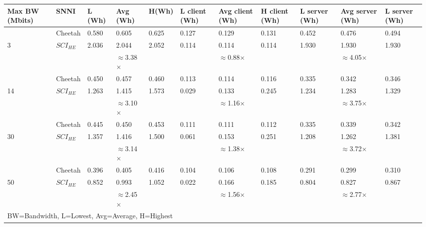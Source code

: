 \begin{tabular}{lllllllllll}
Max BW (Mbits) & SNNI    & L (Wh) & Avg (Wh) & H(Wh) & L client (Wh) & Avg client (Wh) & H client (Wh) & L server (Wh) & Avg server (Wh) & L server (Wh) \\ \hline
               & Cheetah & 0.580  & 0.605    & 0.625 & 0.127         & 0.129           & 0.131         & 0.452         & 0.476           & 0.494         \\
3              & $SCI_{HE}$  & 2.036  & 2.044    & 2.052 & 0.114         & 0.114           & 0.114         & 1.930         & 1.930           & 1.930         \\ \cline{3-11} 
               &         &        & $\approx$3.38$\times$    &       &               & $\approx$0.88$\times$           &               &               & $\approx$4.05$\times$           &               \\ \hline
               & Cheetah & 0.450  & 0.457    & 0.460 & 0.113         & 0.114           & 0.116         & 0.335         & 0.342           & 0.346         \\
14             & $SCI_{HE}$  & 1.263  & 1.415    & 1.573 & 0.029         & 0.133           & 0.245         & 1.234         & 1.283           & 1.329         \\ \cline{3-11} 
               &         &        & $\approx$3.10$\times$    &       &               & $\approx$1.16$\times$           &               &               & $\approx$3.75$\times$           &               \\ \hline
               & Cheetah & 0.445  & 0.450    & 0.453 & 0.111         & 0.111           & 0.112         & 0.335         & 0.339           & 0.342         \\
30             & $SCI_{HE}$  & 1.357  & 1.416    & 1.500 & 0.061         & 0.153           & 0.251         & 1.208         & 1.262           & 1.381         \\ \cline{3-11} 
               &         &        & $\approx$3.14$\times$    &       &               & $\approx$1.38$\times$           &               &               & $\approx$3.72$\times$           &               \\ \hline
               & Cheetah & 0.396  & 0.405    & 0.416 & 0.104         & 0.106           & 0.108         & 0.291         & 0.299           & 0.310         \\
50             & $SCI_{HE}$  & 0.852  & 0.993    & 1.052 & 0.022         & 0.166           & 0.185         & 0.804         & 0.827           & 0.867         \\ \cline{3-11} 
               &         &        & $\approx$2.45$\times$    &       &               & $\approx$1.56$\times$           &               &               & $\approx$2.77$\times$           &               \\ \hline
\multicolumn{11}{l}{BW=Bandwidth, L=Lowest, Avg=Average, H=Highest}                                                                                     
\end{tabular}